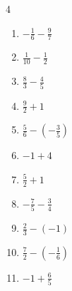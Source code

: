 \begin{multicols}{4}
\begin{enumerate}

  \item $\displaystyle -\frac{1}{6} - \frac{9}{7}$


  \item $\displaystyle \frac{1}{10} - \frac{1}{2}$


  \item $\displaystyle \frac{8}{3} - \frac{4}{5}$


\columnbreak %

\resetques

  \item $\displaystyle \frac{9}{2} + 1$


  \item $\displaystyle \frac{5}{6} - \left(-\frac{3}{5}\right)$


  \item $\displaystyle -1 + 4$

        \phantom{$\displaystyle =3$}

  \item $\displaystyle \frac{5}{2} + 1$


  \item $\displaystyle -\frac{7}{5} - \frac{3}{4}$


  \item $\displaystyle \frac{2}{3} - \left(-1\right)$


  \item $\displaystyle \frac{7}{2} - \left(-\frac{1}{6}\right)$


  \item $\displaystyle -1 + \frac{6}{5}$



\end{enumerate}
\end{multicols}

